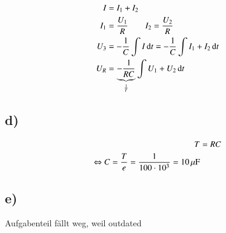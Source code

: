 \begin{align*}
I &= I_1 + I_2 \\
I_1 &= \frac{U_1}{R} \qquad I_2 = \frac{U_2}{R} \\
U_3 &= - \frac{1}{C} \int I \, \mathrm d t = - \frac{1}{C} \int I_1 + I_2 \, \mathrm d t \\
U_R &= \underbrace{ - \frac{1}{RC}}_{\frac{1}{T}} \int U_1 + U_2 \, \mathrm d t
\end{align*}

\subsection*{d)}

\begin{align*}
T &= RC \\ 
\Leftrightarrow C = \frac{T}{e} = \frac{1}{100 \cdot 10^3} = \unit[10]{\mu F}
\end{align*}


\subsection*{e)}

Aufgabenteil fällt weg, weil outdated















